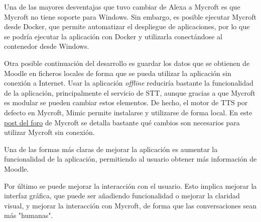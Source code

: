 Una de las mayores desventajas que tuvo cambiar de Alexa a Mycroft es que Mycroft no tiene soporte para Windows. Sin embargo, es posible ejecutar Mycroft desde Docker\cite{DockerSoftware2020}, que permite automatizar el despliegue de aplicaciones, por lo que se podría ejecutar la aplicación con Docker y utilizarla conectándose al contenedor desde Windows.

Otra posible continuación del desarrollo es guardar los datos que se obtienen de Moodle en ficheros locales de forma que se pueda utilizar la aplicación sin conexión a Internet. Usar la aplicación \textit{offline} reduciría bastante la funcionalidad de la aplicación, principalmente el servicio de STT, aunque gracias a que Mycroft es modular se pueden cambiar estos elementos. De hecho, el motor de TTS por defecto en Mycroft, Mimic\cite{Mimic} permite instalarse y utilizarse de forma local. En este \href{https://community.mycroft.ai/t/can-i-use-mycroft-offline/5306/5}{post del foro} de Mycroft se detalla bastante qué cambios son necesarios para utilizar Mycroft sin conexión.

Una de las formas más claras de mejorar la aplicación es aumentar la funcionalidad de la aplicación, permitiendo al usuario obtener más información de Moodle.

Por último se puede mejorar la interacción con el usuario. Esto implica mejorar la interfaz gráfica, que puede ser añadiendo funcionalidad o mejorar la claridad visual, y mejorar la interacción con Mycroft, de forma que las conversaciones sean más "humanas".
